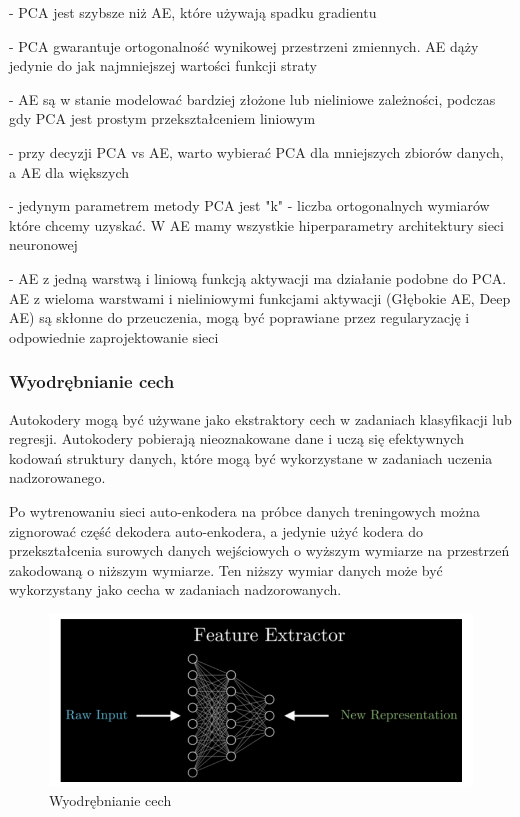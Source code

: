 \documentclass[12pt]{mwbk}
\theoremstyle{plain}
\theoremstyle{definition}
\theoremstyle{remark}
\newcommand\zrodlo[1]{\par\vspace{-3mm}{\small\textit{Źródło: }#1 }}
\begin{document}
- PCA jest szybsze niż AE, które używają spadku gradientu 

- PCA gwarantuje ortogonalność wynikowej przestrzeni zmiennych. AE dąży jedynie do jak najmniejszej wartości funkcji straty

- AE są w stanie modelować bardziej złożone lub nieliniowe zależności, podczas gdy PCA jest prostym przekształceniem liniowym

- przy decyzji PCA vs AE, warto wybierać PCA dla mniejszych zbiorów danych, a AE dla większych

- jedynym parametrem metody PCA jest "k" - liczba ortogonalnych wymiarów które chcemy uzyskać. W AE mamy wszystkie hiperparametry architektury sieci neuronowej

- AE z jedną warstwą i liniową funkcją aktywacji ma działanie podobne do PCA. AE z wieloma warstwami i nieliniowymi funkcjami aktywacji (Głębokie AE, Deep AE) są skłonne do przeuczenia, mogą być poprawiane przez regularyzację i odpowiednie zaprojektowanie sieci

\subsubsection{Wyodrębnianie cech}

Autokodery mogą być używane jako ekstraktory cech w zadaniach klasyfikacji lub regresji. Autokodery pobierają nieoznakowane dane i uczą się efektywnych kodowań struktury danych, które mogą być wykorzystane w zadaniach uczenia nadzorowanego.

Po wytrenowaniu sieci auto-enkodera na próbce danych treningowych można zignorować część dekodera auto-enkodera, a jedynie użyć kodera do przekształcenia surowych danych wejściowych o wyższym wymiarze na przestrzeń zakodowaną o niższym wymiarze. Ten niższy wymiar danych może być wykorzystany jako cecha w zadaniach nadzorowanych.

\begin{figure}[!h]
	\centering
	\includegraphics[width=0.8\linewidth]{rys/feature_extractor.png}
	\caption{Wyodrębnianie cech}
	\zrodlo{towards data science}
	\label{fig:feature-extractor}
\end{figure}
\end{document}
